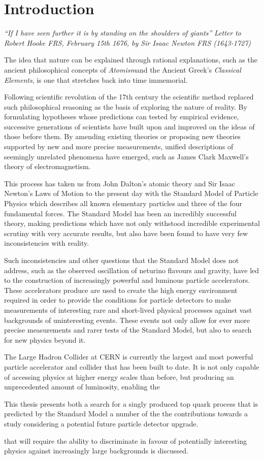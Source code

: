 \chapter{Introduction}\label{chapter:intro}

\emph{``If I have seen further it is by standing on the shoulders of giants''}
\emph{Letter to Robert Hooke FRS, February 15th 1676, by Sir Isaac Newton FRS (1643-1727)}

The idea that nature can be explained through rational explanations, such as the ancient philosophical concepts of \emph{Atomism}and the Ancient Greek's \emph{Classical Elements}, is one that stretches back into time immemorial.

Following scientific revolution of the 17th century the scientific method replaced such philosophical reasoning as the basis of exploring the nature of reality.
By formulating hypotheses whose predictions can tested by empirical evidence, successive generations of scientists
have built upon and improved on the ideas of those before them.
By amending existing theories or proposing new theories supported by new and more precise measurements, unified descriptions of seemingly unrelated phenomena have emerged, such as James Clark Maxwell's theory of electromagnetism.

This process has taken us from John Dalton's atomic theory and Sir Isaac Newton's Laws of Motion to the present day with the Standard Model of Particle Physics which describes all known elementary particles and three of the four fundamental forces.
The Standard Model has been an incredibly successful theory, making predictions which have not only withstood incredible experimental scrutiny with very accurate results, but also have been found to have very few inconsistencies with reality.

Such inconsistencies and other questions that the Standard Model does not address, such as the observed oscillation of neturino flavours and gravity, have led to the construction of increasingly powerful and luminous particle accelerators.
These accelerators produce are used to create the high energy environment required in order to provide the conditions for particle detectors to make measurements of interesting rare and short-lived physical processes against vast backgrounds of uninteresting events.
These events not only allow for ever more precise measurements and rarer tests of the Standard Model, but also to search for new physics beyond it.

The Large Hadron Collider at CERN is currently the largest and most powerful particle accelerator and collider that has been built to date.
It is not only capable of accessing physics at higher energy scales than before, but producing an unprecedented amount of luminosity, enabling the 

This thesis presents both a search for a singly produced top quark process that is predicted by the Standard Model a number of the the contributions towards a study considering a potential future particle detector upgrade.


 that will require the ability to discriminate in favour of potentially interesting physics against increasingly large backgrounds is discussed.